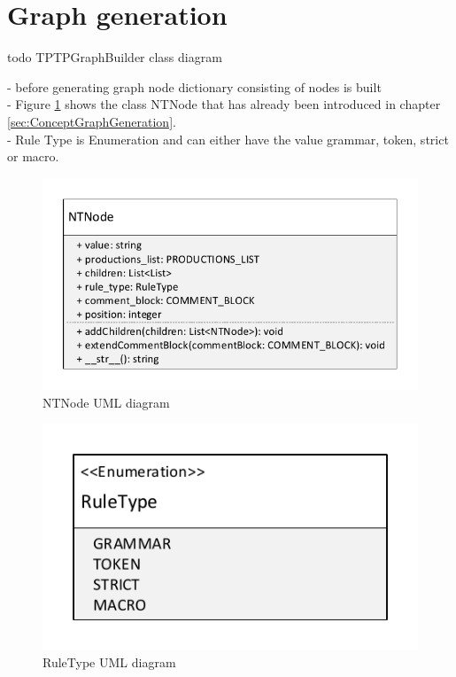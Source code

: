 \section{Graph generation}\label{sec:ImplementationGraphGeneration}
todo TPTPGraphBuilder class diagram



- before generating graph node dictionary consisting of nodes is built \\
- Figure \ref{fig:ImplementationNTNodeUML} shows the class NTNode that has already been introduced in chapter \ref{sec:ConceptGraphGeneration}. \\
- Rule Type is Enumeration and can either have the value grammar, token, strict or macro.

\begin{figure}[H]
\centering
\includegraphics[width=1\textwidth]{images/uml_data_types_NTNode.pdf}
\caption{NTNode UML diagram}
\label{fig:ImplementationNTNodeUML}
\end{figure}

\begin{figure}[H]
\centering
\includegraphics[width=.7\textwidth]{images/uml_data_types_rule_type.pdf}
\caption{RuleType UML diagram}
\label{fig:ImplementationRuleTypeUML}
\end{figure}

